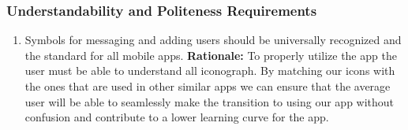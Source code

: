 \documentclass[]{article}
\begin{document}
\subsubsection{Understandability and Politeness Requirements}
\label{ssub:understandability_and_politeness_requirements}
\begin{enumerate}[{UH-UP}1. ]
	\item Symbols for messaging and adding users should be universally recognized and the standard for all mobile apps. \newline
	      \textbf{Rationale:} To properly utilize the app the user must be able to understand all iconograph. By matching our icons with the ones that are used in other similar apps we can ensure that the average user will be able to seamlessly make the transition to using our app without confusion and contribute to a lower learning curve for the app.
\end{enumerate}
\end{document}

